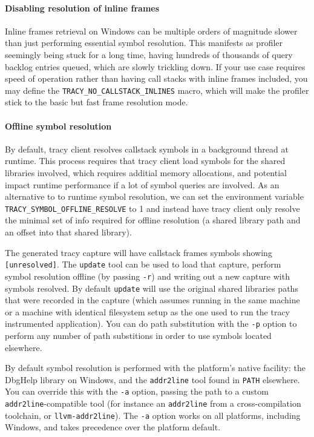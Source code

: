 \documentclass[hidelinks,titlepage,a4paper,twoside]{article}
\begin{document}
\paragraph{Disabling resolution of inline frames}

Inline frames retrieval on Windows can be multiple orders of magnitude slower than just performing essential symbol resolution. This manifests as profiler seemingly being stuck for a long time, having hundreds of thousands of query backlog entries queued, which are slowly trickling down. If your use case requires speed of operation rather than having call stacks with inline frames included, you may define the \texttt{TRACY\_NO\_CALLSTACK\_INLINES} macro, which will make the profiler stick to the basic but fast frame resolution mode.

\paragraph{Offline symbol resolution}

By default, tracy client resolves callstack symbols in a background thread at runtime.
This process requires that tracy client load symbols for the shared libraries
involved, which requires additial memory allocations, and potential impact runtime performance if a lot of symbol queries are involved.
As an alternative to to runtime symbol resolution, we can set the environment variable
 \texttt{TRACY\_SYMBOL\_OFFLINE\_RESOLVE} to 1 and instead have tracy client only resolve
 the minimal set of info required for offline resolution (a shared library path and an offset into that shared library).

The generated tracy capture will have callstack frames symbols showing \texttt{[unresolved]}.
The \texttt{update} tool can be used to load that capture, perform symbol resolution offline
(by passing \texttt{-r}) and writing out a new capture with symbols resolved.
By default \texttt{update} will use the original shared libraries paths that were recorded
in the capture (which assumes running in the same machine or a machine with identical
filesystem setup as the one used to run the tracy instrumented application).
 You can do path substitution with the \texttt{-p} option to perform any number of path
substitions in order to use symbols located elsewhere.

By default symbol resolution is performed with the platform's native facility: the DbgHelp
library on Windows, and the \texttt{addr2line} tool found in \texttt{PATH} elsewhere. You can
override this with the \texttt{-a} option, passing the path to a custom
\texttt{addr2line}-compatible tool (for instance an \texttt{addr2line} from a cross-compilation
toolchain, or \texttt{llvm-addr2line}). The \texttt{-a} option works on all platforms, including
Windows, and takes precedence over the platform default.
\end{document}
